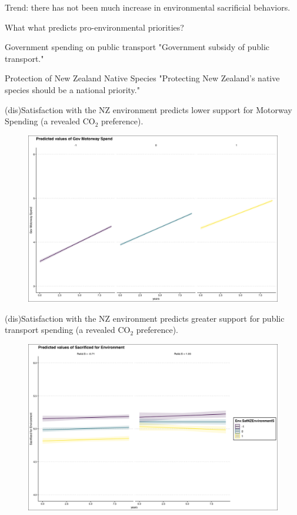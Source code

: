 \documentclass{beamer}
\begin{document}
\begin{frame}{Trend: there has not been much increase in environmental sacrificial behaviors.}
\begin{frame}{What what predicts pro-environmental priorities?}
\begin{alertblock}{Government spending on public transport}
"Government subsidy of public transport."
\end{alertblock}

\begin{alertblock}{Protection of New Zealand Native Species}
"Protecting New Zealand’s native species should be a national priority."
\end{alertblock}

    
\end{frame}

\begin{frame}{(dis)Satisfaction with the NZ environment predicts lower support for Motorway Spending (a revealed CO$_2$ preference).}
\begin{figure}
\includegraphics[width=.8\textwidth,height=\textheight,keepaspectratio]{Figures/XY_PLOT_Env.MotorwaySpend.SATENVIRON.png}
\end{figure}
\end{frame}

\begin{frame}{(dis)Satisfaction with the NZ environment predicts greater support for public transport spending (a revealed CO$_2$ preference).}
\begin{figure}
\includegraphics[width=.8\textwidth,height=\textheight,keepaspectratio]{Figures/X_SACRIFICEMADE_Env.SatNZEnvironmentS_Relid.S}
\end{figure}
\end{frame}


\end{frame}
\end{document}
